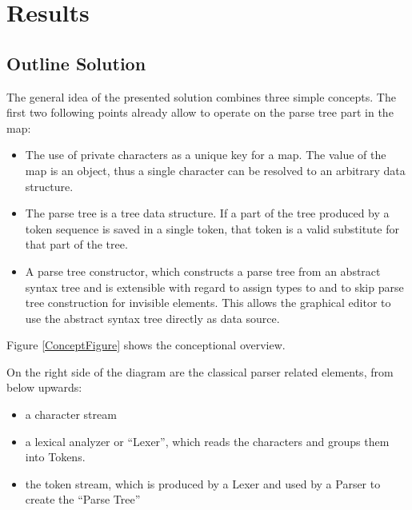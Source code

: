 \chapter{Results}

\section{Outline Solution}

The general idea of the presented solution combines three simple concepts. The first two following points already allow to operate on the parse tree part in the map:
\begin{itemize}
	\item The use of private characters as a unique key for a map. The value of the map is an object, thus a single character can be resolved to an arbitrary data structure.
	\item The parse tree is a tree data structure. If a part of the tree produced by a token sequence is saved in a single token, that token is a valid substitute for that part of the tree.
	\item A parse tree constructor, which constructs a parse tree from an abstract syntax tree and is extensible with regard to assign types to and to skip parse tree construction for invisible elements. This allows the graphical editor to use the abstract syntax tree directly as data source. 
\end{itemize}

Figure \ref{ConceptFigure} shows the conceptional overview. 

On the right side of the diagram are the classical parser related elements, from below upwards:
\begin{itemize}
	\item a character stream
	\item a lexical analyzer or ``Lexer'', which reads the characters and groups them into Tokens.
	\item the token stream, which is produced by a Lexer and used by a Parser to create the ``Parse Tree''
\end{itemize}


